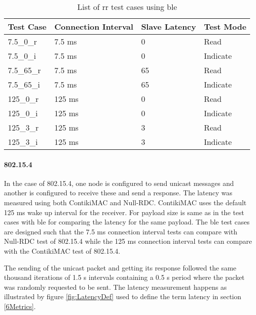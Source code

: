 \begin{table}[h]
\begin{center}
\vspace{5pt}
    \begin{tabular}{|l|l|l|l|}
\hline Test Case & Connection Interval & Slave Latency & Test Mode \\
\hline 7.5\_0\_r & 7.5 ms              & 0             & Read      \\
\hline 7.5\_0\_i & 7.5 ms              & 0             & Indicate  \\
\hline 7.5\_65\_r& 7.5 ms              & 65            & Read      \\
\hline 7.5\_65\_i& 7.5 ms              & 65            & Indicate  \\
\hline 125\_0\_r & 125 ms              & 0             & Read      \\
\hline 125\_0\_i & 125 ms              & 0             & Indicate  \\
\hline 125\_3\_r & 125 ms              & 3             & Read      \\
\hline 125\_3\_i & 125 ms              & 3             & Indicate  \\
\hline
    \end{tabular}
    \caption{List of \gls{rr} test cases using \gls{ble}}
    \vspace{-20pt}
    \label{tbl:RRTestsBLE}
    \end{center}
\end{table}

\paragraph{802.15.4}
In the case of 802.15.4, one node is configured to send unicast messages and another is configured to receive these and send a response. The latency was measured using both ContikiMAC and Null-RDC. ContikiMAC uses the default 125 ms wake up interval for the receiver. For payload size is same as in the test cases with \gls{ble}  for comparing the latency for the same payload. The \gls{ble} test cases are designed such that the 7.5 \si{\milli\second} connection interval tests can compare with Null-RDC test of 802.15.4 while the 125 \si{\milli\second} connection interval tests can compare with the ContikiMAC test of 802.15.4.

The sending of the unicast packet and getting its response followed the same thousand iterations of 1.5 s intervals containing a 0.5 s period where the packet was randomly requested to be sent. The latency measurement happens as illustrated by figure \ref{fig:LatencyDef} used to define the term latency in section \ref{6Metrics}.